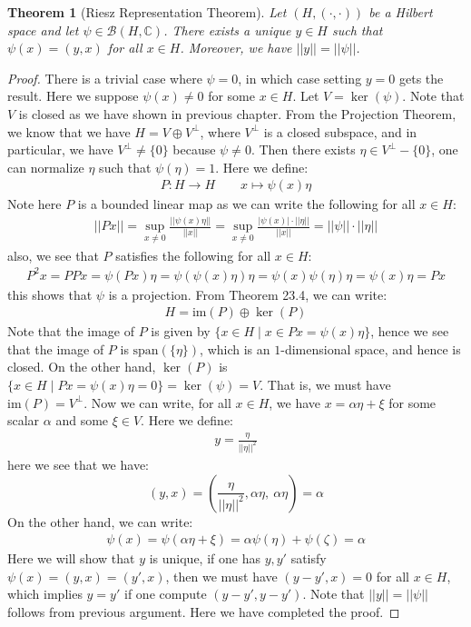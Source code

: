 \documentclass[11pt]{book}
\theoremstyle{break}
\theoremstyle{break}
\newtheorem{thm}{Theorem}[section]
\newcommand{\C}{\mathbb{C}}
\newcommand{\spa}{\text{span}}
\newcommand{\im}{\text{im}}
\begin{document}
\begin{thm}[Riesz Representation Theorem]
Let $(H,(\cdot,\cdot))$ be a Hilbert space and let $\psi \in \mathcal{B}(H,\C)$. There exists a unique $y \in H$ such that $\psi(x) = (y,x)$ for all $x \in H$. Moreover, we have $||y|| = ||\psi||$. 
\end{thm}
\begin{proof}
There is a trivial case where $\psi = 0$, in which case setting $y=0$ gets the result. Here we suppose $\psi(x) \neq 0$ for some $x \in H$. Let $V = \ker(\psi)$. Note that $V$ is closed as we have shown in previous chapter. From the Projection Theorem, we know that we have $H = V \oplus V^\perp$, where $V^\perp$ is a closed subspace, and in particular, we have $V^\perp \neq \{0\}$ because $\psi \neq 0$. Then there exists $\eta \in V^\perp-\{0\}$, one can normalize $\eta$ such that $\psi(\eta) = 1$. Here we define:
\begin{align*}
P:H\to H \qquad x \mapsto \psi(x) \eta
\end{align*}
Note here $P$ is a bounded linear map as we can write the following for all $x \in H$:
\begin{align*}
||Px|| = \sup_{x\neq 0}\frac{||\psi(x)\eta||}{||x||} = \sup_{x\neq 0}\frac{|\psi(x)|\cdot ||\eta||}{||x||} = ||\psi|| \cdot ||\eta||
\end{align*}
also, we see that $P$ satisfies the following for all $x \in H$:
\begin{align*}
P^2 x = PPx = \psi(Px) \eta = \psi(\psi(x) \eta) \eta = \psi(x) \psi(\eta) \eta = \psi(x)\eta = Px
\end{align*}
this shows that $\psi$ is a projection. From Theorem 23.4, we can write:
\begin{align*}
H = \im(P) \oplus \ker(P)
\end{align*}
Note that the image of $P$ is given by $\{x \in H \mid x \in Px = \psi(x) \eta\}$, hence we see that the image of $P$ is $\spa(\{\eta\})$, which is an $1$-dimensional space, and hence is closed. On the other hand, $\ker(P)$ is $\{ x \in H \mid Px = \psi(x)\eta = 0 \} = \ker(\psi) = V$. That is, we must have $\im(P) = V^\perp$. Now we can write, for all $x \in H$, we have $x = \alpha \eta + \xi$ for some scalar $\alpha$ and some $\xi \in V$. Here we define:
\begin{align*}
y = \frac{\eta}{||\eta||^2}
\end{align*}
here we see that we have:
$$(y,x) = \left( \frac{\eta}{||\eta||^2}, \alpha \eta,\ \alpha\eta\right) = \alpha $$
On the other hand, we can write:
\begin{align*}
\psi(x) = \psi(\alpha\eta+ \xi) = \alpha \psi(\eta) + \psi(\zeta) = \alpha
\end{align*}
Here we will show that $y$ is unique, if one has $y , y'$ satisfy $\psi(x) = (y,x) = (y',x)$, then we must have $(y-y', x) = 0$ for all $x \in H$, which implies $y = y'$ if one compute $(y-y' , y-y')$. Note that $||y|| = ||\psi||$ follows from previous argument. Here we have completed the proof.
\end{proof}
\end{document}

